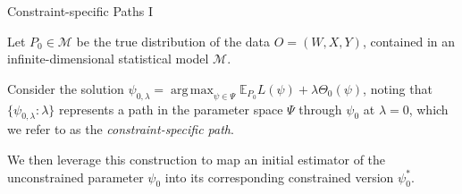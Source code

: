 \documentclass[12pt,t]{beamer}
\newcommand{\E}{\mathbb{E}}
\DeclareMathOperator*{\argmax}{arg\,max}
\begin{document}

\begin{frame}[c]{Constraint-specific Paths I}

\begin{center}

Let $P_0 \in \mathcal{M}$ be the true distribution of the data $O = (W, X, Y)$,
contained in an infinite-dimensional statistical model $\mathcal{M}$.

\vspace{1em}

Consider the solution $\psi_{0, \lambda} = \argmax_{\psi \in \Psi}
\E_{P_0}L(\psi) + \lambda \Theta_0(\psi)$, noting that $\{\psi_{0, \lambda} :
\lambda\}$ represents a path in the parameter space $\Psi$ through $\psi_0$ at
$\lambda = 0$, which we refer to as the \textit{constraint-specific path}.

\vspace{1em}

We then leverage this construction to map an initial estimator of the
unconstrained parameter $\psi_0$ into its corresponding constrained version
$\psi_0^*$.
\end{center}

\note{
}

\end{frame}

\end{document}
